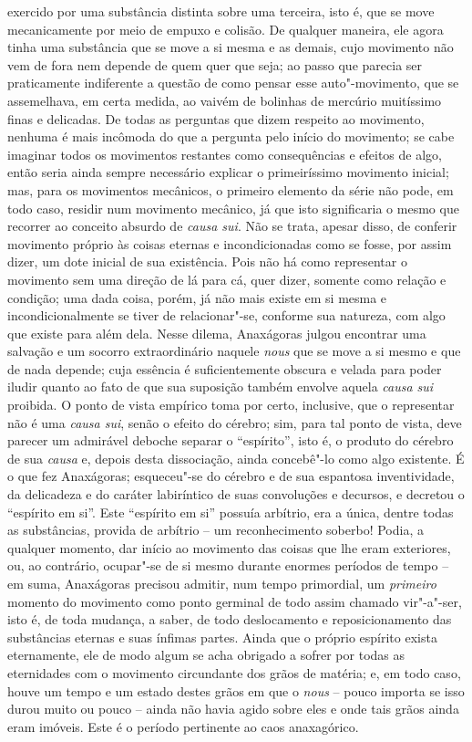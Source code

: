 exercido por uma substância distinta sobre uma terceira, isto é, que se
move mecanicamente por meio de empuxo e colisão. De qualquer maneira,
ele agora tinha uma substância que se move a si mesma e as demais, cujo
movimento não vem de fora nem depende de quem quer que seja; ao passo
que parecia ser praticamente indiferente a questão de como pensar esse
auto"-movimento, que se assemelhava, em certa medida, ao vaivém de
bolinhas de mercúrio muitíssimo finas e delicadas. De todas as
perguntas que dizem respeito ao movimento, nenhuma é mais incômoda do
que a pergunta pelo início do movimento; se cabe imaginar todos os
movimentos restantes como consequências e efeitos de algo, então seria
ainda sempre necessário explicar o primeiríssimo movimento inicial;
mas, para os movimentos mecânicos, o primeiro elemento da série não
pode, em todo caso, residir num movimento mecânico, já que isto
significaria o mesmo que recorrer ao conceito absurdo de \textit{causa \label{causasui}
sui}. Não se trata, apesar disso, de conferir movimento próprio às
coisas eternas e incondicionadas como se fosse, por assim dizer, um
dote inicial de sua existência. Pois não há como representar o
movimento sem uma direção de lá para cá, quer dizer, somente como
relação e condição; uma dada coisa, porém, já não mais existe em si
mesma e incondicionalmente se tiver de relacionar"-se, conforme sua
natureza, com algo que existe para além dela. Nesse dilema, Anaxágoras \label{nessedilema}
julgou encontrar uma salvação e um socorro extraordinário naquele
\textit{nous} que se move a si mesmo e que de nada depende; cuja
essência é suficientemente obscura e velada para poder iludir quanto ao
fato de que sua suposição também envolve aquela \textit{causa sui}
proibida. O ponto de vista empírico toma por certo, inclusive, que o
representar não é uma \textit{causa sui}, senão o efeito do
cérebro; sim, para tal ponto de vista, deve parecer um admirável
deboche separar o ``espírito'', isto é, o produto do cérebro de sua \textit{causa}
e, depois desta dissociação, ainda concebê"-lo como algo existente. É o
que fez Anaxágoras; esqueceu"-se do cérebro e de sua espantosa
inventividade, da delicadeza e do caráter labiríntico de suas
convoluções e decursos, e decretou o ``espírito em si''. Este ``espírito
em si'' possuía arbítrio, era a única, dentre todas as substâncias,
provida de arbítrio -- um reconhecimento soberbo! Podia, a qualquer
momento, dar início ao movimento das coisas que lhe eram exteriores,
ou, ao contrário, ocupar"-se de si mesmo durante enormes períodos de
tempo -- em suma, Anaxágoras precisou admitir, num tempo primordial, um
\textit{primeiro} momento do movimento como ponto germinal de todo
assim chamado vir"-a"-ser, isto é, de toda mudança, a saber, de
todo deslocamento e reposicionamento das substâncias eternas e suas
ínfimas partes. Ainda que o próprio espírito exista eternamente, ele de
modo algum se acha obrigado a sofrer por todas as eternidades com o
movimento circundante dos grãos de matéria; e, em todo caso, houve um
tempo e um estado destes grãos em que o \textit{nous} -- pouco importa
se isso durou muito ou pouco -- ainda não havia agido sobre eles e onde
tais grãos ainda eram imóveis. Este é o período pertinente ao caos anaxagórico.

